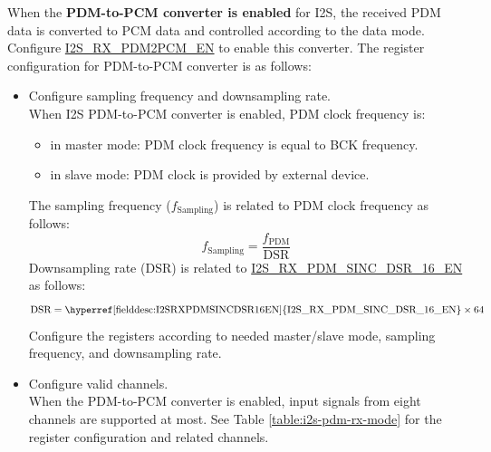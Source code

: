 \documentclass[main\_\_EN.tex]{subfiles}
\begin{document}
When the \textbf{PDM-to-PCM converter is enabled} for I2S, the received PDM data is converted to PCM data and controlled according to the data mode. Configure \hyperref[fielddesc:I2SRXPDM2PCMEN]{I2S\_RX\_PDM2PCM\_EN} to enable this converter. The register configuration for PDM-to-PCM converter is as follows:

\begin{itemize}
    \item Configure sampling frequency and downsampling rate.\\
    When I2S PDM-to-PCM converter is enabled, PDM clock frequency is:
    \begin{itemize}
        \item in master mode: PDM clock frequency is equal to BCK frequency.
        \item in slave mode: PDM clock is provided by external device.
    \end{itemize}
    The sampling frequency ($f_{\textrm{Sampling}}$) is related to PDM clock frequency as follows:
    $$f_{\textrm{Sampling}} = \frac{f_{\textrm{PDM}}}{\textrm{DSR}}$$
    Downsampling rate (DSR) is related to \hyperref[fielddesc:I2SRXPDMSINCDSR16EN]{I2S\_RX\_PDM\_SINC\_DSR\_16\_EN} as follows:
    $${\textrm{DSR}} = {\textrm{\hyperref[fielddesc:I2SRXPDMSINCDSR16EN]{I2S\_RX\_PDM\_SINC\_DSR\_16\_EN}}} \times {\textrm{64}}$$
    Configure the registers according to needed master/slave mode, sampling frequency, and downsampling rate.
    \item Configure valid channels. \\
    When the PDM-to-PCM converter is enabled, input signals from eight channels are supported at most. See Table \ref{table:i2s-pdm-rx-mode} for the register configuration and related channels.


\end{itemize}
\end{document}
